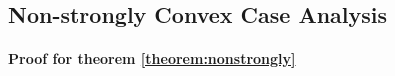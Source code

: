 \documentclass{article} %
\theoremstyle{plain}
\theoremstyle{definition}
\theoremstyle{remark}
\begin{document}


\subsection{Non-strongly Convex Case Analysis}
\label{convexproof}

\paragraph{Proof for theorem \ref{theorem:nonstrongly}}
\end{document}

